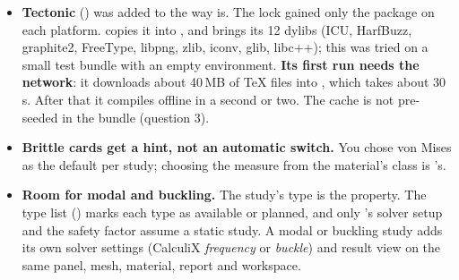 \begin{itemize}[nosep]
         and ), , ,  and ,
        so it compiles under Tectonic (XeTeX),  and . Compilers are tried in this
        order: the preference , Tectonic in , in the pixi environment, on
        , then  and  on  or in .
        A report written headless has no renders and says so. Fixed on the way: every number of 100 or more
        printed as ``$>100$'' (the safety-factor cap was applied to all values), so $E$ showed as ``$>100$\,MPa''.
  \item \textbf{Tectonic} () was added to  the way  is. The lock gained
        only the  package on each platform.  copies it into
        , and  brings its 12 dylibs (ICU, HarfBuzz, graphite2,
        FreeType, libpng, zlib, iconv, glib, libc++); this was tried on a small test bundle with an empty
        environment. \textbf{Its first run needs the network}: it downloads about 40\,MB of TeX files into
        , which takes about 30\,s. After that it compiles offline
        in a second or two. The cache is not pre-seeded in the bundle (question 3).
  \item \textbf{Brittle cards get a hint, not an automatic switch.} You chose von Mises as the default per study;
        choosing the measure from the material's class is 's.
  \item \textbf{Room for modal and buckling.} The study's type is the  property. The type list
        () marks each type as available or planned, and only 's solver setup
        and the safety factor assume a static study. A modal or buckling study adds its own solver settings
        (CalculiX \emph{frequency} or \emph{buckle}) and result view on the same panel, mesh, material, report
        and workspace.
\end{itemize}

